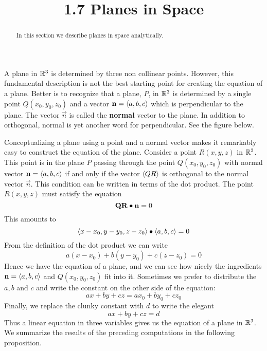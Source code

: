 \documentclass[handout]{ximera}
\title{1.7 Planes in Space}
\begin{document}
\begin{abstract}
In this section we describe planes in space analytically.
\end{abstract}
 
\maketitle

A plane in $\mathbb R^3$ is determined by three non collinear points. 
However, this fundamental description is not the best starting point for creating the equation of a plane.
Better is to recognize that a plane, $P$, in $\mathbb R^3$ is determined by a single point $Q(x_0, y_0, z_0)$ and a 
vector $\mathbf{n} = \left\langle a, b, c\right\rangle$ which is perpendicular to the plane. 
The vector $\vec{n}$ is called the {\bf normal} vector to the plane.
In addition to orthogonal, normal is yet another word for perpendicular.
See the figure below.

\begin{image}
\end{image}

Conceptualizing a plane using a point and a normal vector makes it remarkably easy to construct the equation of the plane.
Consider a point $R(x, y, z)$ in $\mathbb R^3$.
This point is in the plane $P$ passing through the point $Q(x_0, y_0, z_0)$ with normal vector $\mathbf{n} =\left\langle a, b, c\right\rangle$
if and only if the vector $\left\langle QR\right\rangle$ is orthogonal to the normal vector $\vec{n}$.
This condition can be written in terms of the dot product.
The point $R(x, y, z)$ must satisfy the equation
\[
\mathbf{QR} \bullet \mathbf{n} = 0
\]
This amounts to 
\[
\left\langle x - x_0, y-y_0, z-z_0\right\rangle \bullet \left\langle a, b, c\right\rangle = 0
\]
From the definition of the dot product we can write
\[
a(x-x_0) + b(y-y_0) + c(z-z_0) = 0
\]
Hence we have the equation of a plane, and we can see how nicely the ingredients $\mathbf{n} = \left\langle a,b,c\right\rangle$
and $Q(x_0, y_0, z_0)$ fit into it.
Sometimes we prefer to distribute the $a, b$ and $c$ and write the constant on the other side of the equation:
\[
ax + by + cz = ax_0 + by_0 + cz_0
\]
Finally, we replace the clunky constant with $d$ to write the elegant
\[
ax + by + cz = d
\]
Thus a linear equation in three variables gives us the equation of a plane in $\mathbb R^3$.
We summarize the results of the preceding computations in the following proposition.
\end{document}
